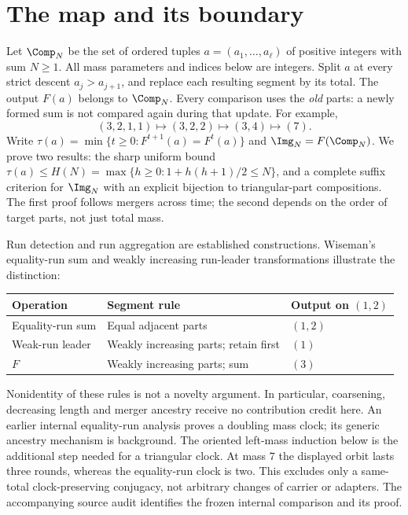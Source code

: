 \section{The map and its boundary}
Let $\Comp_N$ be the set of ordered tuples $a=(a_1,\ldots,a_\ell)$ of
positive integers with sum $N\ge1$. All mass parameters and indices below
are integers. Split $a$ at every strict descent
$a_j>a_{j+1}$, and replace each resulting segment by its total. The output
$F(a)$ belongs to $\Comp_N$. Every comparison uses the \emph{old} parts:
a newly formed sum is not compared again during that update. For example,
\[
 (3,2,1,1)\longmapsto(3,2,2)\longmapsto(3,4)\longmapsto(7).
\]
Write $\tau(a)=\min\{t\ge0:F^{t+1}(a)=F^t(a)\}$ and
$\Img_N=F(\Comp_N)$. We prove two results: the sharp uniform bound
$\tau(a)\le H(N)=\max\{h\ge0:1+h(h+1)/2\le N\}$, and a complete suffix
criterion for $\Img_N$ with an explicit bijection to triangular-part
compositions. The first proof follows mergers across time; the second
depends on the order of target parts, not just total mass.

Run detection and run aggregation are established constructions. Wiseman's
equality-run sum and weakly increasing run-leader transformations
\citep{wiseman2022runs,wiseman2024leaders} illustrate the distinction:
\begin{center}
\begin{tabular}{@{}lll@{}}
\toprule
Operation & Segment rule & Output on $(1,2)$\\
\midrule
Equality-run sum & Equal adjacent parts & $(1,2)$\\
Weak-run leader & Weakly increasing parts; retain first & $(1)$\\
$F$ & Weakly increasing parts; sum & $(3)$\\
\bottomrule
\end{tabular}
\end{center}
Nonidentity of these rules is not a novelty argument. In particular,
coarsening, decreasing length and merger ancestry receive no contribution
credit here. An earlier internal equality-run analysis proves a doubling
mass clock; its generic ancestry mechanism is background. The oriented
left-mass induction below is the additional step needed for a triangular
clock. At mass $7$ the displayed orbit lasts three rounds, whereas the
equality-run clock is two. This excludes only a same-total clock-preserving
conjugacy, not arbitrary changes of carrier or adapters. The accompanying
source audit identifies the frozen internal comparison and its proof.

